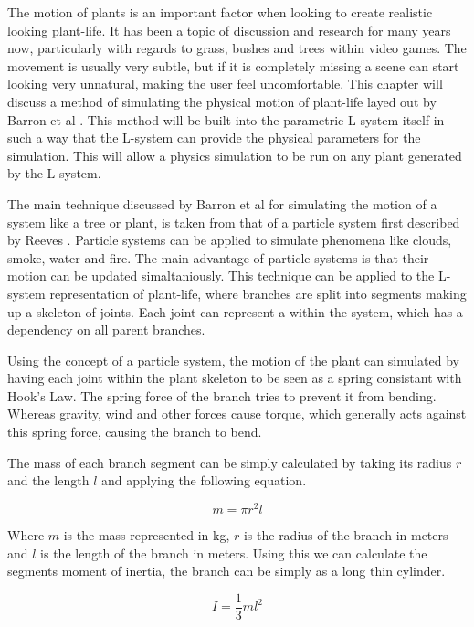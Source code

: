 

\lettrine[lines=3]{T}{}he motion of plants is an important factor when looking to create realistic looking plant-life. It has been a topic of discussion and research for many years now, particularly with regards to grass, bushes and trees within video games. The movement is usually very subtle, but if it is completely missing a scene can start looking very unnatural, making the user feel uncomfortable. This chapter will discuss a method of simulating the physical motion of plant-life layed out by Barron et al \cite{barron2001real}. This method will be built into the parametric L-system itself in such a way that the L-system can provide the physical parameters for the simulation. This will allow a physics simulation to be run on any plant generated by the L-system.

The main technique discussed by Barron et al for simulating the motion of a system like a tree or plant, is taken from that of a particle system first described by Reeves \cite{reeves1983particle}. Particle systems can be applied to simulate phenomena like clouds, smoke, water and fire. The main advantage of particle systems is that their motion can be updated simaltaniously. This technique can be applied to the L-system representation of plant-life, where branches are split into segments making up a skeleton of joints. Each joint can represent a  within the system, which has a dependency on all parent branches.

Using the concept of a particle system, the motion of the plant can simulated by having each joint within the plant skeleton to be seen as a spring consistant with Hook's Law. The spring force of the branch tries to prevent it from bending. Whereas gravity, wind and other forces cause torque, which generally acts against this spring force, causing the branch to bend.

The mass of each branch segment can be simply calculated by taking its radius $r$ and the length $l$ and applying the following equation.

\begin{equation}
m  = \pi r^2 l
\end{equation}

\noindent
Where $m$ is the mass represented in kg, $r$ is the radius of the branch in meters and $l$ is the length of the branch in meters. Using this we can calculate the segments moment of inertia, the branch can be simply as a long thin cylinder.

\begin{equation}
I = \frac{1}{3} m l ^ 2
\end{equation}

